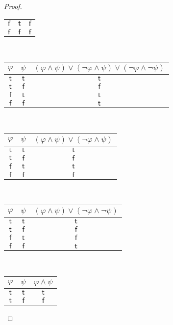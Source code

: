 \documentclass[12pt]{article}
\begin{document}
\begin{proof}
\begin{center}
\begin{tabular}{cc|c}
            $\mathsf{f}$ & $\mathsf{t}$ & $\mathsf{f}$ \\
            $\mathsf{f}$ & $\mathsf{f}$ & $\mathsf{f}$ \\
        \end{tabular}
        ~~
        \begin{tabular}{cc|c}
            $\varphi$ & $\psi$ & $(\varphi \land \psi) \lor (\neg \varphi \land \psi) \lor (\neg \varphi \land \neg \psi)$ \\ \hline
            $\mathsf{t}$ & $\mathsf{t}$ & $\mathsf{t}$ \\
            $\mathsf{t}$ & $\mathsf{f}$ & $\mathsf{f}$ \\
            $\mathsf{f}$ & $\mathsf{t}$ & $\mathsf{t}$ \\
            $\mathsf{f}$ & $\mathsf{f}$ & $\mathsf{t}$ \\
        \end{tabular}
        ~~
        \begin{tabular}{cc|c}
            $\varphi$ & $\psi$ & $(\varphi \land \psi) \lor (\neg \varphi \land \psi)$ \\ \hline
            $\mathsf{t}$ & $\mathsf{t}$ & $\mathsf{t}$ \\
            $\mathsf{t}$ & $\mathsf{f}$ & $\mathsf{f}$ \\
            $\mathsf{f}$ & $\mathsf{t}$ & $\mathsf{t}$ \\
            $\mathsf{f}$ & $\mathsf{f}$ & $\mathsf{f}$ \\
        \end{tabular}
        ~~
        \begin{tabular}{cc|c}
            $\varphi$ & $\psi$ & $(\varphi \land \psi) \lor (\neg \varphi \land \neg \psi)$ \\ \hline
            $\mathsf{t}$ & $\mathsf{t}$ & $\mathsf{t}$ \\
            $\mathsf{t}$ & $\mathsf{f}$ & $\mathsf{f}$ \\
            $\mathsf{f}$ & $\mathsf{t}$ & $\mathsf{f}$ \\
            $\mathsf{f}$ & $\mathsf{f}$ & $\mathsf{t}$ \\
        \end{tabular}
        ~~
        \begin{tabular}{cc|c}
            $\varphi$ & $\psi$ & $\varphi \land \psi$ \\ \hline
            $\mathsf{t}$ & $\mathsf{t}$ & $\mathsf{t}$ \\
            $\mathsf{t}$ & $\mathsf{f}$ & $\mathsf{f}$ \\

\end{tabular}
\end{center}
\end{proof}
\end{document}
